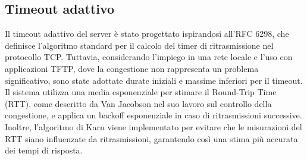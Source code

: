 \documentclass[12pt]{article}
\begin{document}
{\subsection{Timeout adattivo}

Il timeout adattivo del server è stato progettato ispirandosi all'RFC 6298, che definisce l'algoritmo standard per il calcolo del timer di ritrasmissione nel protocollo TCP. Tuttavia, considerando l'impiego in una rete locale e l'uso con applicazioni TFTP, dove la congestione non rappresenta un problema significativo, sono state adottate durate iniziali e massime inferiori per il timeout. Il sistema utilizza una media esponenziale per stimare il Round-Trip Time (RTT), come descritto da Van Jacobson nel suo lavoro sul controllo della congestione, e applica un backoff esponenziale in caso di ritrasmissioni successive. Inoltre, l'algoritmo di Karn viene implementato per evitare che le misurazioni del RTT siano influenzate da ritrasmissioni, garantendo così una stima più accurata dei tempi di risposta.

}
\end{document}
